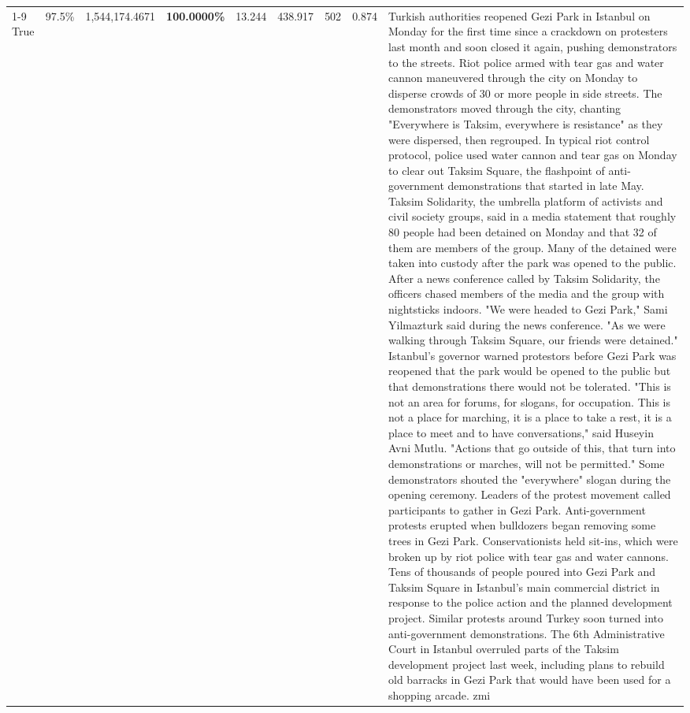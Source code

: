 \begin{table}[H]
\begin{tabular}{lllrlllll}
\cline{1-9}
True & 97.5\% & 1,544,174.4671 & \bfseries \color{red} 100.0000\% & 13.244 & 438.917 & 502 & 0.874 & Turkish authorities reopened Gezi Park in Istanbul on Monday for the first time since a crackdown on protesters last month and soon closed it again, pushing demonstrators to the streets. Riot police armed with tear gas and water cannon maneuvered through the city on Monday to disperse crowds of 30 or more people in side streets. The demonstrators moved through the city, chanting "Everywhere is Taksim, everywhere is resistance" as they were dispersed, then regrouped. In typical riot control protocol, police used water cannon and tear gas on Monday to clear out Taksim Square, the flashpoint of anti-government demonstrations that started in late May. Taksim Solidarity, the umbrella platform of activists and civil society groups, said in a media statement that roughly 80 people had been detained on Monday and that 32 of them are members of the group. Many of the detained were taken into custody after the park was opened to the public. After a news conference called by Taksim Solidarity, the officers chased members of the media and the group with nightsticks indoors. "We were headed to Gezi Park," Sami Yilmazturk said during the news conference. "As we were walking through Taksim Square, our friends were detained." Istanbul's governor warned protestors before Gezi Park was reopened that the park would be opened to the public but that demonstrations there would not be tolerated. "This is not an area for forums, for slogans, for occupation. This is not a place for marching, it is a place to take a rest, it is a place to meet and to have conversations," said Huseyin Avni Mutlu. "Actions that go outside of this, that turn into demonstrations or marches, will not be permitted." Some demonstrators shouted the "everywhere" slogan during the opening ceremony. Leaders of the protest movement called participants to gather in Gezi Park. Anti-government protests erupted when bulldozers began removing some trees in Gezi Park. Conservationists held sit-ins, which were broken up by riot police with tear gas and water cannons. Tens of thousands of people poured into Gezi Park and Taksim Square in Istanbul's main commercial district in response to the police action and the planned development project. Similar protests around Turkey soon turned into anti-government demonstrations. The 6th Administrative Court in Istanbul overruled parts of the Taksim development project last week, including plans to rebuild old barracks in Gezi Park that would have been used for a shopping arcade. zmi \\

\end{tabular}
\end{table}
